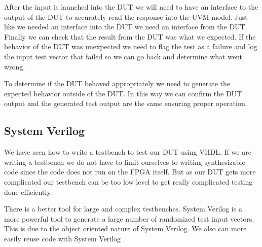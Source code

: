 After the input is launched into the \ac{DUT} we will need to have an interface to the output of the \ac{DUT} to accurately read the response into the \ac{UVM} model. Just like we needed an interface into the \ac{DUT} we need an interface from the \ac{DUT}. Finally we can check that the result from the \ac{DUT} was what we expected. If the behavior of the \ac{DUT} was unexpected we need to flag the test as a failure and log the input test vector that failed so we can go back and determine what went wrong. 

To determine if the \ac{DUT} behaved appropriately we need to generate the expected behavior outside of the \ac{DUT}. In this way we can confirm the \ac{DUT} output and the generated test output are the same ensuring proper operation.  
	
\subsection{System Verilog}

We have seen how to write a testbench to test our \ac{DUT} using \ac{VHDL}. If we are writing a testbench we do not have to limit ourselves to writing synthesizable code since the code does not run on the \ac{FPGA} itself. But as our \ac{DUT} gets more complicated our testbench can be too low level to get really complicated testing done efficiently. 

There is a better tool for large and complex testbenches. System Verilog is a more powerful tool to generate a large number of randomized test input vectors. This is due to the object oriented nature of System Verilog. We also can more easily reuse code with System Verilog \cite{sysvref}. 
